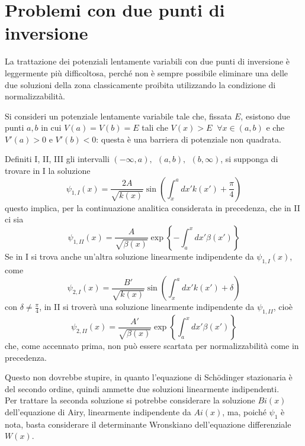 \section{Problemi con due punti di inversione}
La trattazione dei potenziali lentamente variabili con due punti di inversione è leggermente più
difficoltosa, perché non è sempre possibile eliminare una delle due soluzioni della zona
classicamente proibita utilizzando la condizione di normalizzabilità.

Si consideri un potenziale lentamente variabile tale che, fissata $E$, esistono due punti $a,b$ in
cui $V(a)=V(b)=E$ tali che $V(x)>E\phantom{x}\forall x\in(a,b)$ e che $V'(a)>0$ e $V'(b)<0$: questa
è una barriera di potenziale non quadrata.

Definiti I, II, III gli intervalli $(-\infty,a),\phantom{,}(a,b),\phantom{,}(b,\infty)$, si supponga
di trovare in I la soluzione
$$\psi_{1,I}(x)=\frac{2A}{\sqrt{k(x)}}\sin\left(\int_{x}^{a}dx'k(x')+\frac{\pi}{4}\right)$$
questo implica, per la continuazione analitica considerata in precedenza, che in II ci sia
$$\psi_{1,II}(x) = \frac{A}{\sqrt{\beta(x)}}\exp\left\{-\int_{a}^{x}dx'\beta(x')\right\}$$
Se in I si trova anche un'altra soluzione linearmente indipendente da $\psi_{1,I}(x)$, come
$$\psi_{2,I}(x)=\frac{B'}{\sqrt{k(x)}}\sin\left(\int_{x}^{a}dx'k(x')+\delta\right)$$
con $\delta\not= \frac{\pi}{4}$, in II si troverà una soluzione linearmente indipendente da
$\psi_{1,II}$, cioè
$$\psi_{2,II}(x) = \frac{A'}{\sqrt{\beta(x)}}\exp\left\{\int_{a}^{x}dx'\beta(x')\right\}$$
che, come accennato prima, non può essere scartata per normalizzabilità come in precedenza.

Questo non dovrebbe stupire, in quanto l'equazione di Schödinger stazionaria è del secondo ordine,
quindi ammette due soluzioni linearmente indipendenti.\\
Per trattare la seconda soluzione si potrebbe considerare la soluzione $Bi(x)$ dell'equazione di
Airy, linearmente indipendente da $Ai(x)$, ma, poiché $\psi_1$ è nota, basta considerare il
determinante Wronskiano dell'equazione differenziale $W(x)$.

